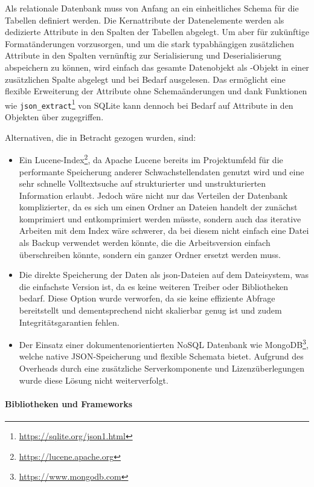 Als relationale Datenbank muss von Anfang an ein einheitliches Schema für die Tabellen definiert werden.
Die Kernattribute der Datenelemente werden als dedizierte Attribute in den Spalten der Tabellen abgelegt.
Um aber für zukünftige Formatänderungen vorzusorgen, und um die stark typabhängigen zusätzlichen Attribute in den Spalten vernünftig zur Serialisierung und Deserialisierung abspeichern zu können, wird einfach das gesamte Datenobjekt als -Objekt in einer zusätzlichen Spalte abgelegt und bei Bedarf ausgelesen.
Das ermöglicht eine flexible Erweiterung der Attribute ohne Schemaänderungen und dank Funktionen wie \texttt{json\_extract}\footnote{\url{https://sqlite.org/json1.html}} von SQLite kann dennoch bei Bedarf auf Attribute in den Objekten über  zugegriffen.

Alternativen, die in Betracht gezogen wurden, sind:

\begin{itemize}
    \itemsep0em
    \item Ein Lucene-Index\footnote{\url{https://lucene.apache.org}}, da Apache Lucene bereits im Projektumfeld für die performante Speicherung anderer Schwachstellendaten genutzt wird und eine sehr schnelle Volltextsuche auf strukturierter und unstrukturierten Information erlaubt.
    Jedoch wäre nicht nur das Verteilen der Datenbank komplizierter, da es sich um einen Ordner an Dateien handelt der zunächst komprimiert und entkomprimiert werden müsste, sondern auch das iterative Arbeiten mit dem Index wäre schwerer, da bei diesem nicht einfach eine Datei als Backup verwendet werden könnte, die die Arbeitsversion einfach überschreiben könnte, sondern ein ganzer Ordner ersetzt werden muss.
    \item Die direkte Speicherung der Daten als \acrshort{json}-Dateien auf dem Dateisystem, was die einfachste Version ist, da es keine weiteren Treiber oder Bibliotheken bedarf.
    Diese Option wurde verworfen, da sie keine effiziente Abfrage bereitstellt und dementsprechend nicht skalierbar genug ist und zudem Integritätsgarantien fehlen.
    \item Der Einsatz einer dokumentenorientierten NoSQL Datenbank wie MongoDB\footnote{\url{https://www.mongodb.com}}, welche native JSON-Speicherung und flexible Schemata bietet.
    Aufgrund des Overheads durch eine zusätzliche Serverkomponente und Lizenzüberlegungen wurde diese Lösung nicht weiterverfolgt.
\end{itemize}

\paragraph{Bibliotheken und Frameworks}

